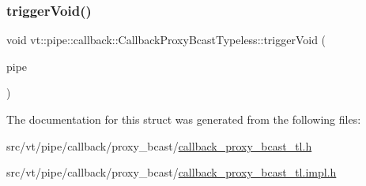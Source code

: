 \mbox{\label{structvt_1_1pipe_1_1callback_1_1_callback_proxy_bcast_typeless_a9abac331854a8e62ba596d14ce920b9e}} 
\subsubsection{\texorpdfstring{trigger\+Void()}{triggerVoid()}}
{\footnotesize\ttfamily void vt\+::pipe\+::callback\+::\+Callback\+Proxy\+Bcast\+Typeless\+::trigger\+Void (\begin{DoxyParamCaption}\item[{\mbox{[}\mbox{[}maybe\+\_\+unused\mbox{]} \mbox{]} \hyperlink{namespacevt_ac9852acda74d1896f48f406cd72c7bd3}{Pipe\+Type} const \&}]{pipe }\end{DoxyParamCaption})\hspace{0.3cm}{\ttfamily [inline]}}



The documentation for this struct was generated from the following files\+:\begin{DoxyCompactItemize}
\item 
src/vt/pipe/callback/proxy\+\_\+bcast/\hyperlink{callback__proxy__bcast__tl_8h}{callback\+\_\+proxy\+\_\+bcast\+\_\+tl.\+h}\item 
src/vt/pipe/callback/proxy\+\_\+bcast/\hyperlink{callback__proxy__bcast__tl_8impl_8h}{callback\+\_\+proxy\+\_\+bcast\+\_\+tl.\+impl.\+h}\end{DoxyCompactItemize}
